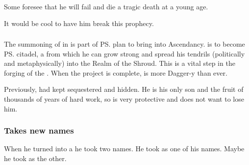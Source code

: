 
Some foresee that he will fail and die a tragic death at a young age.


It would be cool to have him break this prophecy. 





\subsubsection{\Malcur}
The summoning of \Nithdornazsh in \Malcur is part of \ps{\Secherdamon} plan to bring  into Ascendancy. 
\Nithdornazsh{} is to become \ps{\Vizsherioch} citadel, a \nexus{} from which he can grow strong and spread his tendrils (politically and metaphysically) into the Realm of the Shroud. 
This is a vital step in the forging of the . 
When the \Nithdornazsh{} project is complete, \Vizsherioch{} is more Dagger-y than ever. 

Previously, \Secherdamon{} had kept \Vizsherioch{} sequestered and hidden. 
He is his only son and the fruit of thousands of years of hard work, so \Secherdamon{} is very protective and does not want to lose him. 





\subsubsection{Takes new names}
When he turned into a \dragon he took two names. 
He took  as one of his names.
Maybe he took \quo{\Secherdamon} as the other. 





